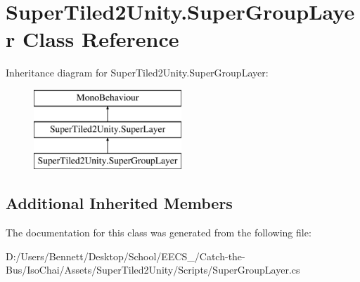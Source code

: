 \hypertarget{class_super_tiled2_unity_1_1_super_group_layer}{}\section{Super\+Tiled2\+Unity.\+Super\+Group\+Layer Class Reference}
\label{class_super_tiled2_unity_1_1_super_group_layer}
Inheritance diagram for Super\+Tiled2\+Unity.\+Super\+Group\+Layer\+:\begin{figure}[H]
\begin{center}
\leavevmode
\includegraphics[height=3.000000cm]{class_super_tiled2_unity_1_1_super_group_layer}
\end{center}
\end{figure}
\subsection*{Additional Inherited Members}


The documentation for this class was generated from the following file\+:\begin{DoxyCompactItemize}
\item 
D\+:/\+Users/\+Bennett/\+Desktop/\+School/\+E\+E\+C\+S\+\_/\+Catch-\/the-\/\+Bus/\+Iso\+Chai/\+Assets/\+Super\+Tiled2\+Unity/\+Scripts/Super\+Group\+Layer.\+cs\end{DoxyCompactItemize}
